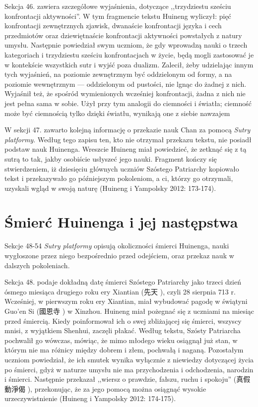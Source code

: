 Sekcja 46. zawiera szczegółowe wyjaśnienia, dotyczące ,,trzydziestu sześciu konfrontacji aktywności''. W tym fragmencie tekstu Huineng wyliczył: pięć konfrontacji zewnętrznych zjawisk, dwanaście konfrontacji języka i cech przedmiotów oraz dziewiętnaście konfrontacji aktywności powstałych z natury umysłu.
Następnie powiedział swym uczniom, że gdy wprowadzą nauki o trzech kategoriach i trzydziestu sześciu konfrontacjach w życie, będą mogli zastosować je w kontekście wszystkich sutr i wyjść poza dualizm.
Zalecił, żeby udzielając innym tych wyjaśnień, na poziomie zewnętrznym być oddzielonym od formy, a na poziomie wewnętrznym --- oddzielonym od pustości, nie lgnąc do żadnej z nich.
Wyjaśnił też, że spośród wymienionych wcześniej konfrontacji, żadna z nich nie jest pełna sama w sobie.
Użył przy tym analogii do ciemności i światła; ciemność może być ciemnością tylko dzięki światłu, wynikają one z siebie nawzajem\ibid

W sekcji 47. zawarto kolejną informację o przekazie nauk Chan za pomocą \textit{Sutry platformy}. %
Według tego zapisu ten, kto nie otrzymał przekazu tekstu, nie posiadł podstaw nauk Huinenga.
Wreszcie Huineng miał powiedzieć, że zetknąć się z tą sutrą to tak, jakby osobiście usłyszeć jego nauki.
Fragment kończy się stwierdzeniem, iż dziesięciu głównych uczniów Szóstego Patriarchy kopiowało tekst i przekazywało go późniejszym pokoleniom, a ci, którzy go otrzymali, uzyskali wgląd w swoją naturę
(Huineng i Yampolsky 2012: 173-174).

\section{Śmierć Huinenga i jej następstwa}
Sekcje 48-54 \textit{Sutry platformy} opisują okoliczności śmierci Huinenga, nauki wygłoszone przez niego bezpośrednio przed odejściem, oraz przekaz nauk w dalszych pokoleniach.

Sekcja 48. podaje dokładną datę śmierci Szóstego Patriarchy jako trzeci dzień ósmego miesiąca drugiego roku ery Xiantian (先天 ), czyli 28 sierpnia 713 r.
Wcześniej, w pierwszym roku ery Xiantian, miał wybudować pagodę w świątyni Guo'en Si (國恩寺 ) w Xinzhou.
Huineng miał pożegnać się z uczniami na miesiąc przed śmiercią.
Kiedy poinformował ich o swej zbliżającej się śmierci, wszyscy mnisi, z wyjątkiem Shenhui, zaczęli płakać.
Według tekstu, Szósty Patriarcha pochwalił go wówczas, mówiąc, że mimo młodego wieku osiągnął już stan, w którym nie ma różnicy między dobrem i złem, pochwałą i naganą.
Pozostałym uczniom powiedział, że ich smutek wynika wyłącznie z niewiedzy dotyczącej życia po śmierci, gdyż w naturze umysłu nie ma przychodzenia i odchodzenia, narodzin i śmierci.
Następnie przekazał ,,wiersz o prawdzie, fałszu, ruchu i spokoju'' (真假動淨偈 ), przekonując, że za jego pomocą można osiągnąć wysokie urzeczywistnienie
(Huineng i Yampolsky 2012: 174-175).

